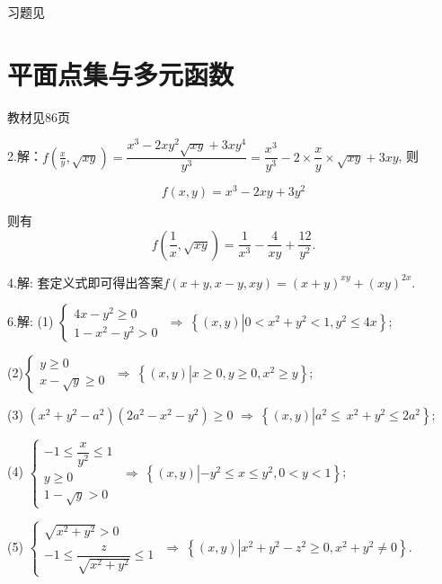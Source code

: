\begin{flushright}
  \color{zhanqing!80}
   习题见
\end{flushright}
\section{平面点集与多元函数}
\begin{flushright}
  \color{zhanqing!80}
   教材见86页
\end{flushright}

  2.解：$f\left( \frac{x}{y}, \sqrt{xy} \right) = \dfrac{x^3 - 2xy^2\sqrt{xy} + 3xy^4}{y^3}=\dfrac{x^3}{y^3} - 2 \times \dfrac{x}{y} \times \sqrt{xy} + 3xy$, 则

  $$f(x,y) = x^3 - 2xy + 3y^2$$

  则有
  $$f\left( \frac{1}{x},\sqrt{xy} \right) = \dfrac{1}{x^3} - \dfrac{4}{xy} + \dfrac{12}{y^2}.$$

  4.解:  套定义式即可得出答案$f(x + y, x-y, xy) = (x + y)^{xy} +(xy)^{2x}$.

  6.解:  (1) $\begin{cases}
  4x - {y^2} \ge 0\\
  1 - {x^2} - {y^2} > 0
  \end{cases}$
  $\Rightarrow ~ \left\{ (x,y)\left|0< x^2 + y^2 <1, y^2 \leq 4x \right. \right\}$;

  (2)$\begin{cases}
  y \ge 0\\
  x - \sqrt y  \ge 0
  \end{cases}$
  $\Rightarrow ~ \left\{ (x,y)\left|x \geq 0, y \geq 0, x^2 \geq y \right. \right\}$;

  \smallskip
  (3) $\left( x^2 + y^2 - a^2 \right) \left( 2a^2 - x^2 - y^2 \right) \geq 0$
  $\Rightarrow ~ \left\{ (x,y)\left|a^2 \leq\ x^2 + y^2 \leq 2a^2 \right. \right\}$;

  (4) $\begin{cases}
  -1 \leq \dfrac{x}{y^2} \leq 1 \\
  y \geq 0 \\
  1 - \sqrt{y} > 0
  \end{cases}$
  $\Rightarrow ~ \left\{ (x,y)\left|-y^2 \leq x \leq y^2, 0<y<1 \right. \right\}$;

  (5) $ \left\{ {\begin{array}{*{20}{l}}
    {\sqrt {{x^2} + {y^2}}  > 0}\\
    { - 1 \le \dfrac{z}{{\sqrt {{x^2} + {y^2}} }} \le 1}
    \end{array}} \right.$
  $\Rightarrow ~ \left\{ (x,y)\left|x^2 + y^2 -z^2 \geq 0, x^2 + y^2 \neq 0 \right. \right\}$.

